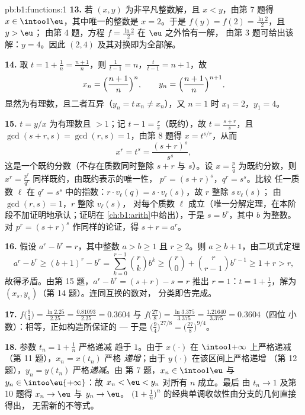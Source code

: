 \begin{solution}{pb:b1:functions:1}
\textbf{13.} 若 $(x, y)$ 为非平凡整数解，且 $x
< y$，由第 7 题得 $x \in \intoo1\eu$，其中唯一的整数是
$x = 2$。于是 $f(y) = f(2) = \frac{\ln2}2$，且 $y > \eu$；
由第 4 题，方程 $f = \frac{\ln2}2$ 在 $\eu$ 之外恰有一解，
由第 3 题可给出该解：$y = 4$。因此
$(2, 4)$ 及其对换即为全部解。

\textbf{14.} 取 $t = 1 + \frac1n = \frac{n+1}n$，则 $\frac1{t - 1}
= n$，$\frac t{t-1} = n + 1$，故
\[
x_n = \Bigl(\frac{n+1}n\Bigr)^{n},
\qquad
y_n = \Bigl(\frac{n+1}n\Bigr)^{n+1},
\]
显然为有理数，且二者互异（$y_n = t\,x_n \neq x_n$），又 $n =
1$ 时 $x_1 = 2$，$y_1 = 4$。

\textbf{15.} $t = y/x$ 为有理数且 $> 1$；记 $t - 1 =
\frac rs$（既约），故 $t = \frac{s + r}s$，且 $\gcd(s +
r, s) = \gcd(r, s) = 1$，由第 8 题得 $x = t^{s/r}$，从而
\[
x^r = t^s = \frac{(s+r)^s}{s^s} ,
\]
这是一个既约分数（不存在质数同时整除 $s + r$ 与
$s$）。设 $x = \frac pq$ 为既约分数，则 $x^r = \frac{p^r}
{q^r}$ 同样既约，由既约表示的唯一性，
$p^r = (s+r)^s$，$q^r = s^s$。比较
任一质数 $\ell$ 在 $q^r = s^s$ 中的指数：$r \cdot
v_\ell(q) = s \cdot v_\ell(s)$，故 $r$ 整除 $s\,v_\ell(s)$；
由 $\gcd(r, s) = 1$，$r$ 整除 $v_\ell(s)$，
对每个质数 $\ell$ 成立（唯一分解定理，在本阶段不加证明地承认；证明在
\cref{ch:b1:arith}中给出），于是 $s = b^r$，其中 $b$ 为整数。对
$p^r = (s+r)^s$ 作同样的论证，得 $s + r = a^r$。

\textbf{16.} 假设 $a^r - b^r = r$，其中整数 $a > b \geq 1$
且 $r \geq 2$。则 $a \geq b + 1$，由二项式定理
\[
a^r - b^r \geq (b+1)^r - b^r
= \sum_{k=0}^{r-1}\binom rk b^k
\geq \binom r0 + \binom r{r-1} b^{r-1}
\geq 1 + r > r ,
\]
故得矛盾。由第 15 题，$a^r - b^r = (s + r) - s = r$
推出 $r = 1$：$t = 1 + \frac1s$，解为 $(x_s,
y_s)$（第 14 题）。连同互换的数对，
分类即告完成。

\textbf{17.} $f\bigl(\tfrac94\bigr) = \frac{\ln 2.25}{2.25} =
\frac{0.81093}{2.25} = 0.3604$ 与 $f\bigl(\tfrac{27}8\bigr) =
\frac{\ln 3.375}{3.375} = \frac{1.21640}{3.375} = 0.3604$（四位
小数）：相等，正如构造所保证的 --- 于是
$\bigl(\tfrac94\bigr)^{27/8} = \bigl(\tfrac{27}8\bigr)^{9/4}$。

\textbf{18.} 参数 $t_n = 1 + \frac1n$ 严格递减
趋于 $1$。由于 $x(\cdot)$ 在
$\intoo1{+\infty}$ 上严格递减（第 11 题），$x_n = x(t_n)$ 严格
\emph{递增}；由于 $y(\cdot)$ 在该区间上严格递增
（第 12 题），$y_n = y(t_n)$ 严格\emph{递减}。由
第 7 题，$x_n \in \intoo1\eu$ 与 $y_n \in
\intoo\eu{+\infty}$：故 $x_n < \eu < y_n$ 对所有 $n$ 成立。最后
由 $t_n \to 1$ 及第 10 题得 $x_n \to \eu$ 与 $y_n \to \eu$。
$\bigl(1 +
\frac1n\bigr)^n$ 的经典单调收敛性由分支的几何直接得出，
无需新的不等式。


\end{solution}
